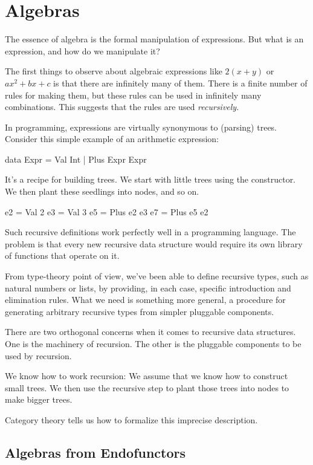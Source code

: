 \documentclass[DaoFP]{subfiles}
\begin{document}
\setcounter{chapter}{11}

\chapter{Algebras}

The essence of algebra is the formal manipulation of expressions. But what is an expression, and how do we manipulate it?

The first things to observe about algebraic expressions like $2 (x + y)$ or $a x^2 + b x + c$ is that there are infinitely many of them. There is a finite number of rules for making them, but these rules can be used in infinitely many combinations. This suggests that the rules are used \emph{recursively}. 


In programming, expressions are virtually synonymous to (parsing) trees. Consider this simple example of an arithmetic expression:
\begin{haskell}
data Expr = Val Int 
          | Plus Expr Expr
\end{haskell}
It's a recipe for building trees. We start with little trees using the  constructor. We then plant these seedlings into nodes, and so on.
\begin{haskell}
e2 = Val 2
e3 = Val 3
e5 = Plus e2 e3
e7 = Plus e5 e2
\end{haskell}

Such recursive definitions work perfectly well in a programming language. The problem is that every new recursive data structure would require its own library of functions that operate on it.

From type-theory point of view, we've been able to define recursive types, such as natural numbers or lists, by providing, in each case, specific introduction and elimination rules. What we need is something more general, a procedure for generating arbitrary recursive types from simpler pluggable components. 

There are two orthogonal concerns when it comes to recursive data structures. One is the machinery of recursion. The other is the pluggable components to be used by recursion. 

We know how to work recursion: We assume that we know how to construct small trees. We then use the recursive step to plant those trees into nodes to make bigger trees. 

Category theory tells us how to formalize this imprecise description.

\section{Algebras from Endofunctors}
\end{document}
